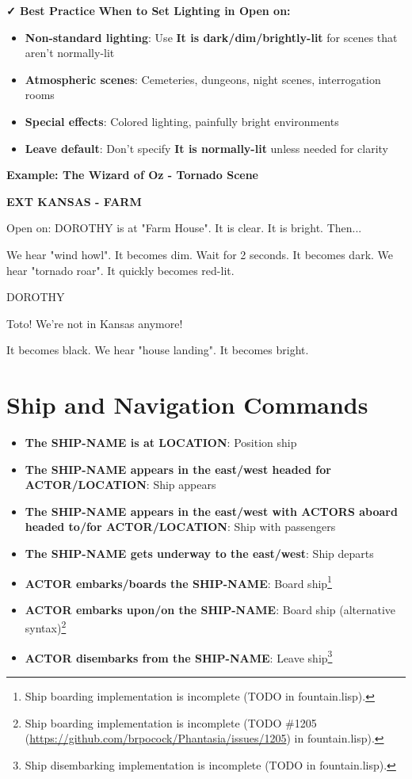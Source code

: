 \documentclass[11pt,letterpaper,oldstylefigures]{memoir}
\newcommand{\slugline}[1]{\nobreak\textbf{\MakeUppercase{#1}}\par\nobreak\vspace{1\baselineskip}}
\newcommand{\speaker}[1]{\nobreak\hspace*{0.333\textwidth}\MakeUppercase{#1}\par\nobreak\vspace{0.5\baselineskip}}
\newcommand{\dialogue}[1]{\nobreak\hspace*{0.25\textwidth}\begin{minipage}{0.5\textwidth}#1\end{minipage}\par\vspace{1\baselineskip}}
\newcommand{\stagedir}[1]{#1\par\vspace{1\baselineskip}}
\newenvironment{FountainExample}
  {\begingroup
  \ttfamily\small
   \setlength{\parindent}{0pt}
  \setlength{\parskip}{0.5em}
  \allowdisplaybreaks
  \setlength{\displaywidowpenalty}{0}
  \setlength{\widowpenalty}{0}
  \setlength{\clubpenalty}{0}
  \setlength{\interlinepenalty}{0}
}
  {\endgroup}
\newcommand{\fountain}[1]{\textbf{#1}}
\begin{document}
\textbf{✓ Best Practice}
\textbf{When to Set Lighting in Open on:}
\begin{itemize}
\item \textbf{Non-standard lighting}: Use \fountain{It is dark/dim/brightly-lit} for scenes that aren't normally-lit
\item \textbf{Atmospheric scenes}: Cemeteries, dungeons, night scenes, interrogation rooms
\item \textbf{Special effects}: Colored lighting, painfully bright environments
\item \textbf{Leave default}: Don't specify \fountain{It is normally-lit} unless needed for clarity
\end{itemize}


\textbf{Example: The Wizard of Oz - Tornado Scene}

\begin{FountainExample}
\slugline{EXT KANSAS - FARM}

\stagedir{Open on: DOROTHY is at "Farm House". It is clear. It is bright. Then...}

\stagedir{We hear "wind howl". It becomes dim. Wait for 2 seconds. It becomes dark. We hear "tornado roar". It quickly becomes red-lit.}

\speaker{DOROTHY}
\dialogue{Toto! We're not in Kansas anymore!}

\stagedir{It becomes black. We hear "house landing". It becomes bright.}
\end{FountainExample}

\section{Ship and Navigation Commands}
\begin{itemize}
\item \fountain{The SHIP-NAME is at LOCATION}: Position ship
\item \fountain{The SHIP-NAME appears in the east/west headed for ACTOR/LOCATION}: Ship appears
\item \fountain{The SHIP-NAME appears in the east/west with ACTORS aboard headed to/for ACTOR/LOCATION}: Ship with passengers
\item \fountain{The SHIP-NAME gets underway to the east/west}: Ship departs
\item \fountain{ACTOR embarks/boards the SHIP-NAME}: Board ship\footnote{Ship boarding implementation is incomplete (TODO in fountain.lisp).}
\item \fountain{ACTOR embarks upon/on the SHIP-NAME}: Board ship (alternative syntax)\footnote{Ship boarding implementation is incomplete (TODO \#1205 (\href{https://github.com/brpocock/Phantasia/issues/1205}{https://github.com/brpocock/Phantasia/issues/1205}) in fountain.lisp).}
\item \fountain{ACTOR disembarks from the SHIP-NAME}: Leave ship\footnote{Ship disembarking implementation is incomplete (TODO in fountain.lisp).}
\end{itemize}
\end{document}
